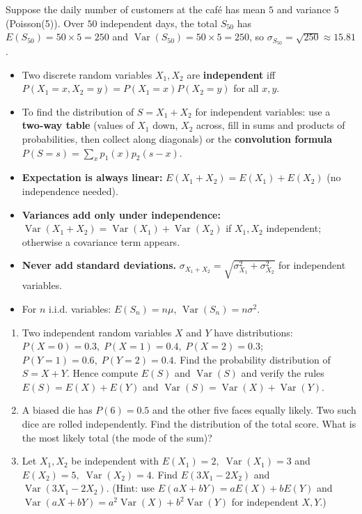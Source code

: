 \documentclass[11pt]{article}
\newcounter{popsec}
\newcounter{popsub}
\newcommand{\courssub}[1]{%
  \stepcounter{popsub}%
  \par\vspace{9pt}\noindent{\popxbold\fontsize{11.5}{13}\selectfont\color{popink}{\color{poporange}\thepopsec.\thepopsub}\hspace{6pt}#1}\par\nopagebreak\vspace{4pt}
}
\begin{document}
\begin{exemplebox}
Suppose the daily number of customers at the café has mean $5$ and variance $5$ (Poisson(5)).  Over $50$ independent days, the total $S_{50}$ has $E(S_{50}) = 50\times5 = 250$ and $\operatorname{Var}(S_{50}) = 50\times5 = 250$, so $\sigma_{S_{50}} = \sqrt{250} \approx 15.81$.
\end{exemplebox}

\courssub{Summary of key points}

\begin{aretenir}
\begin{itemize}
\item Two discrete random variables $X_1,X_2$ are \textbf{independent} iff $P(X_1=x,X_2=y)=P(X_1=x)P(X_2=y)$ for all $x,y$.
\item To find the distribution of $S=X_1+X_2$ for independent variables: use a \textbf{two‑way table} (values of $X_1$ down, $X_2$ across, fill in sums and products of probabilities, then collect along diagonals) or the \textbf{convolution formula} $P(S=s)=\sum_x p_1(x)p_2(s-x)$.
\item \textbf{Expectation is always linear:} $E(X_1+X_2)=E(X_1)+E(X_2)$ (no independence needed).
\item \textbf{Variances add only under independence:} $\operatorname{Var}(X_1+X_2)=\operatorname{Var}(X_1)+\operatorname{Var}(X_2)$ if $X_1,X_2$ independent; otherwise a covariance term appears.
\item \textbf{Never add standard deviations.}  $\sigma_{X_1+X_2} = \sqrt{\sigma_{X_1}^2+\sigma_{X_2}^2}$ for independent variables.
\item For $n$ i.i.d. variables: $E(S_n)=n\mu$, $\operatorname{Var}(S_n)=n\sigma^2$.
\end{itemize}
\end{aretenir}

\begin{exercice}[Practice]
\begin{enumerate}
\item Two independent random variables $X$ and $Y$ have distributions:
$P(X=0)=0.3,\; P(X=1)=0.4,\; P(X=2)=0.3$;
$P(Y=1)=0.6,\; P(Y=2)=0.4$.
Find the probability distribution of $S=X+Y$.  Hence compute $E(S)$ and $\operatorname{Var}(S)$ and verify the rules $E(S)=E(X)+E(Y)$ and $\operatorname{Var}(S)=\operatorname{Var}(X)+\operatorname{Var}(Y)$.
\item A biased die has $P(6)=0.5$ and the other five faces equally likely.  Two such dice are rolled independently.  Find the distribution of the total score.  What is the most likely total (the mode of the sum)?
\item Let $X_1,X_2$ be independent with $E(X_1)=2,\; \operatorname{Var}(X_1)=3$ and $E(X_2)=5,\; \operatorname{Var}(X_2)=4$.  Find $E(3X_1-2X_2)$ and $\operatorname{Var}(3X_1-2X_2)$.  (Hint: use $E(aX+bY)=aE(X)+bE(Y)$ and $\operatorname{Var}(aX+bY)=a^2\operatorname{Var}(X)+b^2\operatorname{Var}(Y)$ for independent $X,Y$.)
\end{enumerate}
\end{exercice}
\end{document}

